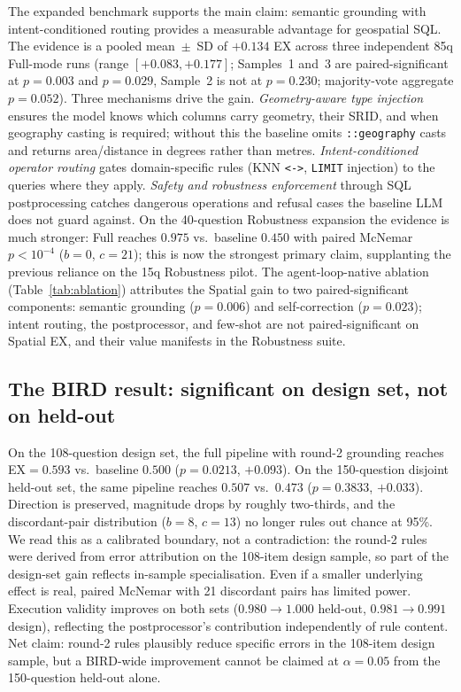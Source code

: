 \documentclass[11pt]{article}
\begin{document}
The expanded benchmark supports the main claim: semantic grounding with intent-conditioned routing provides a measurable advantage for geospatial SQL. The evidence is a pooled mean~$\pm$~SD of $+0.134$ EX across three independent 85q Full-mode runs (range $[+0.083, +0.177]$; Samples~1 and~3 are paired-significant at $p=0.003$ and $p=0.029$, Sample~2 is not at $p=0.230$; majority-vote aggregate $p=0.052$). Three mechanisms drive the gain. \emph{Geometry-aware type injection} ensures the model knows which columns carry geometry, their SRID, and when geography casting is required; without this the baseline omits \texttt{::geography} casts and returns area/distance in degrees rather than metres. \emph{Intent-conditioned operator routing} gates domain-specific rules (KNN \texttt{<->}, \texttt{LIMIT} injection) to the queries where they apply. \emph{Safety and robustness enforcement} through SQL postprocessing catches dangerous operations and refusal cases the baseline LLM does not guard against. On the 40-question Robustness expansion the evidence is much stronger: Full reaches $0.975$ vs.\ baseline $0.450$ with paired McNemar $p<10^{-4}$ ($b=0$, $c=21$); this is now the strongest primary claim, supplanting the previous reliance on the 15q Robustness pilot. The agent-loop-native ablation (Table~\ref{tab:ablation}) attributes the Spatial gain to two paired-significant components: semantic grounding ($p=0.006$) and self-correction ($p=0.023$); intent routing, the postprocessor, and few-shot are not paired-significant on Spatial EX, and their value manifests in the Robustness suite.

\subsection{The BIRD result: significant on design set, not on held-out}

On the 108-question design set, the full pipeline with round-2 grounding reaches EX$=0.593$ vs.\ baseline $0.500$ ($p=0.0213$, $+0.093$). On the 150-question disjoint held-out set, the same pipeline reaches $0.507$ vs.\ $0.473$ ($p=0.3833$, $+0.033$). Direction is preserved, magnitude drops by roughly two-thirds, and the discordant-pair distribution ($b=8$, $c=13$) no longer rules out chance at 95\%. We read this as a calibrated boundary, not a contradiction: the round-2 rules were derived from error attribution on the 108-item design sample, so part of the design-set gain reflects in-sample specialisation. Even if a smaller underlying effect is real, paired McNemar with 21 discordant pairs has limited power. Execution validity improves on both sets ($0.980\to 1.000$ held-out, $0.981\to 0.991$ design), reflecting the postprocessor's contribution independently of rule content. Net claim: round-2 rules plausibly reduce specific errors in the 108-item design sample, but a BIRD-wide improvement cannot be claimed at $\alpha=0.05$ from the 150-question held-out alone.
\end{document}
